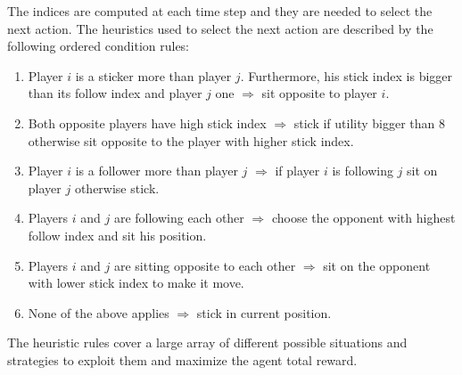 \documentclass[runningheads]{llncs}
\begin{document}
The indices are computed at each time step and they are needed to
select the next action. The heuristics used to select the next action
are described by the following ordered condition rules:
\begin{enumerate}
\item Player $i$ is a sticker more than player $j$. Furthermore, his
  stick index is bigger than its follow index and player $j$
  one $\Rightarrow$ sit opposite to player $i$.
\item Both opposite players have high stick index $\Rightarrow$ stick
  if utility bigger than 8 otherwise sit opposite to the player with
  higher stick index.
\item Player $i$ is a follower more than player $j$ $\Rightarrow$
  if player $i$ is following $j$ sit on player $j$ otherwise stick.
\item Players $i$ and $j$ are following each other $\Rightarrow$
  choose the opponent with highest follow index and sit his position. 
\item Players $i$ and $j$ are sitting opposite to each other
  $\Rightarrow$ sit on the opponent with lower stick index to make it
  move.
\item None of the above applies $\Rightarrow$ stick in current position.
\end{enumerate}
The heuristic rules cover a large array of different possible
situations and strategies to exploit them and maximize the agent total
reward.
\end{document}
